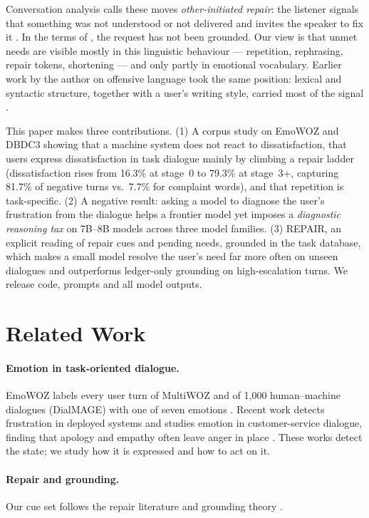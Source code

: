 \documentclass[11pt]{article}
\begin{document}
Conversation analysis calls these moves \emph{other-initiated repair}: the listener signals that something
was not understood or not delivered and invites the speaker to fix it \citep{schegloff1977repair}. In the
terms of \citet{clark1991grounding}, the request has not been grounded. Our view is that unmet needs are
visible mostly in this linguistic behaviour --- repetition, rephrasing, repair tokens, shortening --- and only
partly in emotional vocabulary. Earlier work by the author on offensive language took the same position:
lexical and syntactic structure, together with a user's writing style, carried most of the signal
\citep{chen2012offensive}.

This paper makes three contributions.
(1) A corpus study on EmoWOZ \citep{feng2022emowoz} and DBDC3 \citep{higashinaka2016dbdc} showing that a
machine system does not react to dissatisfaction, that users express dissatisfaction in task dialogue mainly
by climbing a repair ladder (dissatisfaction rises from 16.3\% at stage~0 to 79.3\% at stage~3+, capturing
81.7\% of negative turns vs.\ 7.7\% for complaint words), and that repetition is task-specific.
(2) A negative result: asking a model to diagnose the user's frustration from the dialogue helps a frontier
model yet imposes a \emph{diagnostic reasoning tax} on 7B--8B models across three model families.
(3) REPAIR, an explicit reading of repair cues and pending needs, grounded in the task database, which makes
a small model resolve the user's need far more often on unseen dialogues and outperforms ledger-only grounding
on high-escalation turns. We release code, prompts and all model outputs.

\section{Related Work}
\paragraph{Emotion in task-oriented dialogue.} EmoWOZ labels every user turn of MultiWOZ
\citep{budzianowski2018multiwoz} and of 1,000 human--machine dialogues (DialMAGE) with one of seven emotions
\citep{feng2022emowoz}. Recent work detects frustration in deployed systems
\citep{frustration2024stupidrobot} and studies emotion in customer-service dialogue, finding that apology
and empathy often leave anger in place \citep{emowozcs2025}. These works detect the state; we study how it
is expressed and how to act on it.
\paragraph{Repair and grounding.} Our cue set follows the repair literature \citep{schegloff1977repair} and
grounding theory \citep{clark1991grounding}.
\end{document}
